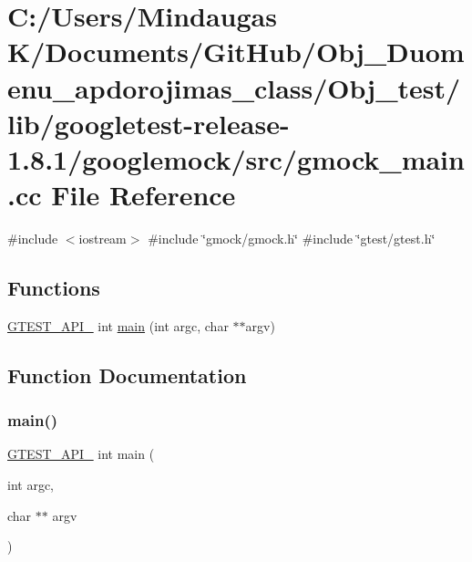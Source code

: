 \hypertarget{_obj__test_2lib_2googletest-release-1_88_81_2googlemock_2src_2gmock__main_8cc}{}\section{C\+:/\+Users/\+Mindaugas K/\+Documents/\+Git\+Hub/\+Obj\+\_\+\+Duomenu\+\_\+apdorojimas\+\_\+class/\+Obj\+\_\+test/lib/googletest-\/release-\/1.8.1/googlemock/src/gmock\+\_\+main.cc File Reference}
\label{_obj__test_2lib_2googletest-release-1_88_81_2googlemock_2src_2gmock__main_8cc}
{\ttfamily \#include $<$iostream$>$}\newline
{\ttfamily \#include \char`\"{}gmock/gmock.\+h\char`\"{}}\newline
{\ttfamily \#include \char`\"{}gtest/gtest.\+h\char`\"{}}\newline
\subsection*{Functions}
\begin{DoxyCompactItemize}
\item 
\mbox{\hyperlink{_obj__test_2lib_2googletest-release-1_88_81_2googletest_2include_2gtest_2internal_2gtest-port_8h_aa73be6f0ba4a7456180a94904ce17790}{G\+T\+E\+S\+T\+\_\+\+A\+P\+I\+\_\+}} int \mbox{\hyperlink{_obj__test_2lib_2googletest-release-1_88_81_2googlemock_2src_2gmock__main_8cc_a7f83bdc516d2cb86e20235d94ddf055a}{main}} (int argc, char $\ast$$\ast$argv)
\end{DoxyCompactItemize}


\subsection{Function Documentation}
\mbox{\label{_obj__test_2lib_2googletest-release-1_88_81_2googlemock_2src_2gmock__main_8cc_a7f83bdc516d2cb86e20235d94ddf055a}} 
\subsubsection{\texorpdfstring{main()}{main()}}
{\footnotesize\ttfamily \mbox{\hyperlink{_obj__test_2lib_2googletest-release-1_88_81_2googletest_2include_2gtest_2internal_2gtest-port_8h_aa73be6f0ba4a7456180a94904ce17790}{G\+T\+E\+S\+T\+\_\+\+A\+P\+I\+\_\+}} int main (\begin{DoxyParamCaption}\item[{int}]{argc,  }\item[{char $\ast$$\ast$}]{argv }\end{DoxyParamCaption})}

